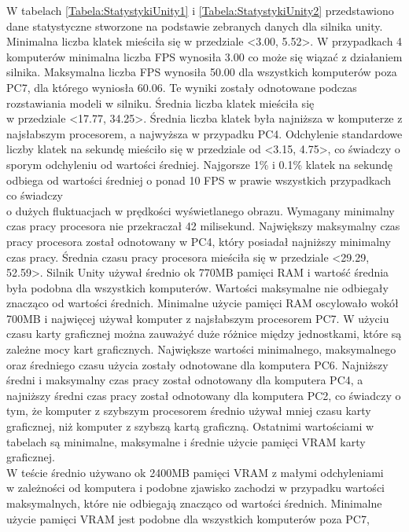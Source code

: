 \documentclass[12pt,twoside]{article}
\begin{document}
W tabelach \ref{Tabela:StatystykiUnity1} i \ref{Tabela:StatystykiUnity2}
przedstawiono dane statystyczne stworzone na podstawie zebranych danych dla
silnika unity. Minimalna liczba klatek mieściła się w przedziale <3.00, 5.52>. W
przypadkach 4 komputerów minimalna liczba FPS wynosiła 3.00 co może się wiązać z
działaniem silnika. Maksymalna liczba FPS wynosiła 50.00 dla wszystkich
komputerów poza PC7, dla którego wyniosła 60.06. Te wyniki zostały odnotowane
podczas rozstawiania modeli w silniku. Średnia liczba klatek mieściła się\\w
przedziale <17.77, 34.25>. Średnia liczba klatek była najniższa w komputerze z
najsłabszym procesorem, a najwyższa w przypadku PC4. Odchylenie standardowe
liczby klatek na sekundę mieściło się w przedziale od <3.15, 4.75>, co świadczy
o sporym odchyleniu od wartości średniej. Najgorsze 1\% i 0.1\% klatek
na sekundę odbiega od wartości średniej o ponad 10 FPS w prawie wszystkich
przypadkach co świadczy\\o dużych fluktuacjach w prędkości wyświetlanego obrazu.
Wymagany minimalny czas pracy procesora nie przekraczał 42 milisekund.
Największy maksymalny czas pracy procesora został odnotowany w PC4, który
posiadał najniższy minimalny czas pracy.  Średnia czasu pracy procesora mieściła
się w przedziale <29.29, 52.59>. Silnik Unity używał średnio ok 770MB pamięci
RAM i wartość średnia była podobna dla wszystkich komputerów. Wartości
maksymalne nie odbiegały znacząco od wartości średnich. Minimalne użycie pamięci
RAM oscylowało wokół 700MB i najwięcej używał komputer z najsłabszym procesorem
PC7. W użyciu czasu karty graficznej można zauważyć duże różnice między
jednostkami, które są zależne mocy kart graficznych. Największe wartości
minimalnego, maksymalnego oraz średniego czasu użycia zostały odnotowane dla
komputera PC6. Najniższy średni i maksymalny czas pracy został odnotowany dla
komputera PC4, a najniższy średni czas pracy został odnotowany dla komputera
PC2, co świadczy o tym, że komputer z szybszym procesorem średnio używał mniej
czasu karty graficznej, niż komputer z szybszą kartą graficzną. Ostatnimi
wartościami w tabelach są minimalne, maksymalne i średnie użycie pamięci VRAM
karty graficznej.\\W teście średnio używano ok 2400MB pamięci VRAM z małymi
odchyleniami\\w zależności od komputera i podobne zjawisko zachodzi w przypadku
wartości maksymalnych, które nie odbiegają znacząco od wartości średnich.
Minimalne użycie pamięci VRAM jest podobne dla wszystkich komputerów poza PC7,
\end{document}

